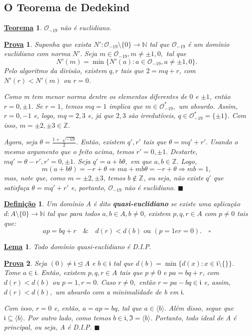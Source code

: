\documentclass{article}
\newtheorem*{def*}{\underline{Defini\c c\~ao}}
\newtheorem*{theorem*}{\underline{Teorema}}
\newtheorem*{lemma*}{\underline{Lema}}
\newtheorem*{proof*}{\underline{Prova}}
\renewcommand\qedsymbol{$\blacksquare$}
\begin{document}
\subsection{O Teorema de Dedekind}
\begin{theorem*}
  \(\mathcal{O}_{-19}\) não é euclidiano.
\end{theorem*}
\begin{proof*}
  Suponha que exista \(N':\mathcal{O}_{-19}\setminus{\{0\}}\rightarrow \mathbb{N}\) tal que \(\mathcal{O}_{-19}\) é um domínio euclidiano com norma \(N'.\) Seja \(m\in \mathcal{O}_{-19}, m\neq \pm1, 0,\)
  tal que 
  \[
    N'(m) = \min\{N'(a): a\in \mathcal{O}_{-19}, a\neq \pm1, 0\}.
  \]
  Pelo algoritmo da divisão, existem \(q, r\) tais que \(2 = mq + r\), com \(N'(r) < N'(m)\)
  ou \(r=0\).

  Como m tem menor norma dentre os elementos diferentes de \(0\) e \(\pm 1\), então \(r=0, \pm1\). Se \(r=1\), temos
  \(mq = 1\) implica que \(m\in \mathcal{O}_{-19}^{*},\) um absurdo. Assim, \(r=0, -1\) e,
  logo, \(mq = 2, 3\) e, já que \(2, 3\) são irredutíveis, \(q\in \mathcal{O}_{-19}^{*} = \{\pm1\}.\) Com isso,
  \(m=\pm2, \pm 3\in \mathbb{Z}.\)

  Agora, seja \(\theta = \frac{1 + \sqrt[]{-19}}{2}.\) Então, existem \(q', r'\) tais que \(\theta  = mq'+r'.\) Usando o mesmo
  argumento que o feito acima, temos \(r'=0, \pm1.\) Destarte, \(mq'=\theta - r', r'=0, \pm1.\) Seja \(q'= a + b\theta ,\)
  em que \(a, b\in \mathbb{Z}.\) Logo, 
  \[
    m(a + b\theta ) = -r + \theta  \Rightarrow ma + mb\theta = -r + \theta  \Rightarrow mb = 1,
  \]
  mas, note que, como \(m = \pm2, \pm3\), temos \(b\not\in \mathbb{Z}\), ou seja, não existe \(q'\) que satisfaça \(\theta  = mq' + r'\) e, portanto,
  \(\mathcal{O}_{-19}\) não é euclidiano. \qedsymbol
\end{proof*}
\begin{def*}
  Um domínio A é dito \textbf{quasi-euclidiano} se existe uma aplicação \(d:A\setminus{\{0\}}\rightarrow \mathbb{N}\) tal que para todos \(a, b\in A, b\neq0\),
  existem \(p, q, r\in A\) com \(p\neq0\) tais que: 
  \[
    ap = bq + r\quad\&\quad d(r) < d(b) \text{ ou } (p=1 e r=0).\quad\square
  \]
\end{def*}
\begin{lemma*}
  Todo domínio quasi-euclidiano é D.I.P.
\end{lemma*}
\begin{proof*}
  Seja \((0)\neq \mathfrak{i}\trianglelefteq{A}\) e \(b\in \mathfrak{i}\) tal que \(d(b) = \min\{d(x):x\in \mathfrak{i}\setminus{\{\}}\}\).
  Tome \(a\in \mathfrak{i}.\) Então, existem \(p, q, r\in A\) tais que \(p\neq 0\) e \(pa = bq + r\), com \(d(r) < d(b)\) ou \(p=1, r=0.\)
  Caso \(r\neq 0,\) então \(r = pa-bq\in \mathfrak{i}\) e, assim, \(d(r) < d(b),\) um absurdo com a minimalidade de b em \(\mathfrak{i}.\)

  Com isso, \(r=0\) e, então, \(a = ap = bq\), tal que \(a\in \langle b \rangle.\) Além disso, segue que \(\mathfrak{i}\subseteq{\langle b \rangle}.\)
  Por outro lado, como temos \(b\in \mathfrak{i}, \mathfrak{I} = \langle b \rangle\). Portanto, todo ideal de A é principal, ou seja, A é D.I.P. \qedsymbol
\end{proof*}
\end{document}
